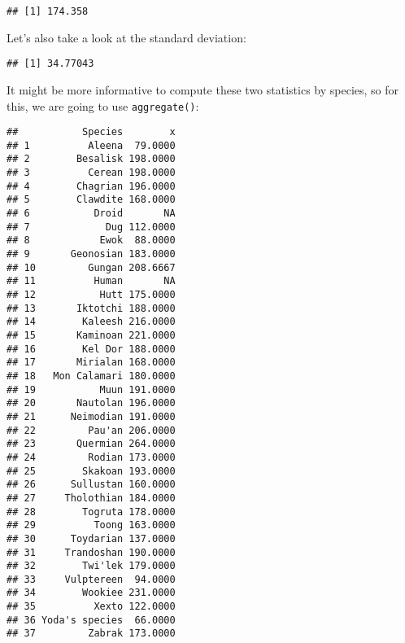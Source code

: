\documentclass[
]{article}
\newenvironment{Shaded}{\begin{snugshade}}{\end{snugshade}}
\newcommand{\DataTypeTok}[1]{\textcolor[rgb]{0.13,0.29,0.53}{#1}}
\newcommand{\KeywordTok}[1]{\textcolor[rgb]{0.13,0.29,0.53}{\textbf{#1}}}
\newcommand{\NormalTok}[1]{#1}
\newcommand{\OperatorTok}[1]{\textcolor[rgb]{0.81,0.36,0.00}{\textbf{#1}}}
\newcommand{\OtherTok}[1]{\textcolor[rgb]{0.56,0.35,0.01}{#1}}
\begin{document}
\begin{Shaded}
\end{Shaded}

\begin{verbatim}
## [1] 174.358
\end{verbatim}

Let's also take a look at the standard deviation:

\begin{Shaded}
\end{Shaded}

\begin{verbatim}
## [1] 34.77043
\end{verbatim}

It might be more informative to compute these two statistics by species, so for this, we are going
to use \texttt{aggregate()}:

\begin{Shaded}
\end{Shaded}

\begin{verbatim}
##           Species        x
## 1          Aleena  79.0000
## 2        Besalisk 198.0000
## 3          Cerean 198.0000
## 4        Chagrian 196.0000
## 5        Clawdite 168.0000
## 6           Droid       NA
## 7             Dug 112.0000
## 8            Ewok  88.0000
## 9       Geonosian 183.0000
## 10         Gungan 208.6667
## 11          Human       NA
## 12           Hutt 175.0000
## 13       Iktotchi 188.0000
## 14        Kaleesh 216.0000
## 15       Kaminoan 221.0000
## 16        Kel Dor 188.0000
## 17       Mirialan 168.0000
## 18   Mon Calamari 180.0000
## 19           Muun 191.0000
## 20       Nautolan 196.0000
## 21      Neimodian 191.0000
## 22         Pau'an 206.0000
## 23       Quermian 264.0000
## 24         Rodian 173.0000
## 25        Skakoan 193.0000
## 26      Sullustan 160.0000
## 27     Tholothian 184.0000
## 28        Togruta 178.0000
## 29          Toong 163.0000
## 30      Toydarian 137.0000
## 31     Trandoshan 190.0000
## 32        Twi'lek 179.0000
## 33     Vulptereen  94.0000
## 34        Wookiee 231.0000
## 35          Xexto 122.0000
## 36 Yoda's species  66.0000
## 37         Zabrak 173.0000
\end{verbatim}
\end{document}
